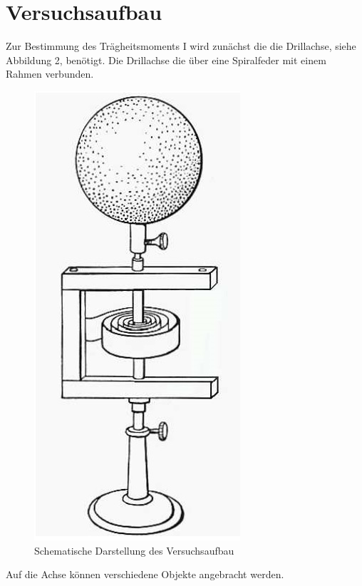 \section{Versuchsaufbau}
Zur Bestimmung des Trägheitsmoments I wird zunächst die
die Drillachse, siehe Abbildung 2, benötigt. Die Drillachse
die über eine Spiralfeder mit einem Rahmen verbunden.
\begin{figure}[H]
  \centering
  \includegraphics[width=5 cm , height= 10 cm]{Bild2.jpg}
   \caption{Schematische Darstellung des Versuchsaufbau}
\end{figure}
Auf die Achse können verschiedene Objekte angebracht werden.

